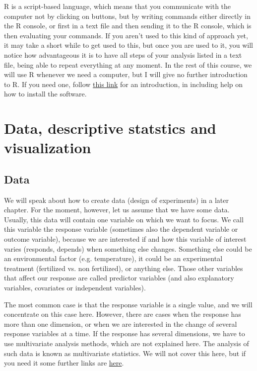 \documentclass[a4paper,twoside]{tufte-book} %
\begin{document}
R is a script-based language, which means that you communicate with the computer not by clicking on buttons, but by writing commands either directly in the R console, or first in a text file and then sending it to the R console, which is then evaluating your commands. If you aren't used to this kind of approach yet, it may take a short while to get used to this, but once you are used to it, you will notice how advantageous it is to have all steps of your analysis listed in a text file, being able to repeat everything at any moment. In the rest of this course, we will use R whenever we need a computer, but I will give no further introduction to R. If you need one, follow  \href{http://biometry.github.io/APES/R/R10-gettingStarted.html}{this link} for an introduction, in including help on how to install the software.

\chapter{Data, descriptive statstics and visualization}


\section{Data}

We will speak about how to create data (design of experiments) in a later chapter. For the moment, however, let us assume that we have some data. Usually, this data will contain one variable on which we want to focus.  We call this variable the response variable (sometimes also the dependent variable or outcome variable), because we are interested if and how this variable of interest varies (responds, depends) when something else changes. Something else could be an environmental factor (e.g. temperature), it could be an experimental treatment (fertilized vs. non fertilized), or anything else.  Those other variables that affect our response are called predictor variables (and also explanatory variables, covariates or independent variables). 

The most common case is that the response variable is a single value, and we will concentrate on this case here. However, there are cases when the response has more than one dimension, or when we are interested in the change of several response variables at a time. {If the response has several dimensions, we have to use multivariate analysis methods, which are not explained here.} The analysis of such data is known as multivariate statistics. We will not cover this here, but if you need it some further links are \href{http://biometry.github.io/APES/Stats/stats50-MultivariateStatistics.html}{here}.
\end{document}
